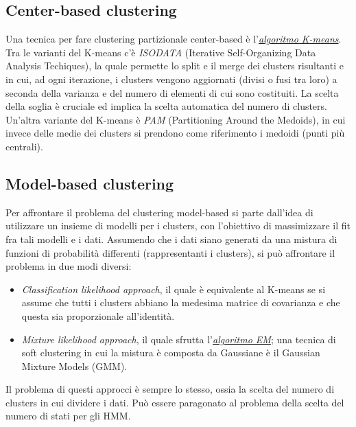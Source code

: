 \documentclass[a4paper,oneside,titlepage]{book}
\begin{document}
\subsection{Center-based clustering}
Una tecnica per fare clustering partizionale center-based è l'\hyperref[K-means]{\textit{algoritmo K-means}}. Tra le varianti del K-means c'è \textit{ISODATA} (Iterative Self-Organizing Data Analysis Techiques), la quale permette lo split e il merge dei clusters risultanti e in cui, ad ogni iterazione, i clusters vengono aggiornati (divisi o fusi tra loro) a seconda della varianza e del numero di elementi di cui sono costituiti. La scelta della soglia è cruciale ed implica la scelta automatica del numero di clusters. Un'altra variante del K-means è \textit{PAM} (Partitioning Around the Medoids), in cui invece delle medie dei clusters si prendono come riferimento i medoidi (punti più centrali).

\subsection{Model-based clustering}
Per affrontare il problema del clustering model-based si parte dall'idea di utilizzare un insieme di modelli per i clusters, con l'obiettivo di massimizzare il fit fra tali modelli e i dati. Assumendo che i dati siano generati da una mistura di funzioni di probabilità differenti (rappresentanti i clusters), si può affrontare il problema in due modi diversi:
\begin{itemize}
    \item \textit{Classification likelihood approach}, il quale è equivalente al K-means se si assume che tutti i clusters abbiano la medesima matrice di covarianza e che questa sia proporzionale all'identità.
    \item \textit{Mixture likelihood approach}, il quale sfrutta l'\hyperref[EM]{\textit{algoritmo EM}}; una tecnica di soft clustering in cui la mistura è composta da Gaussiane è il Gaussian Mixture Models (GMM).
\end{itemize}
Il problema di questi approcci è sempre lo stesso, ossia la scelta del numero di clusters in cui dividere i dati. Può essere paragonato al problema della scelta del numero di stati per gli HMM.
\end{document}
